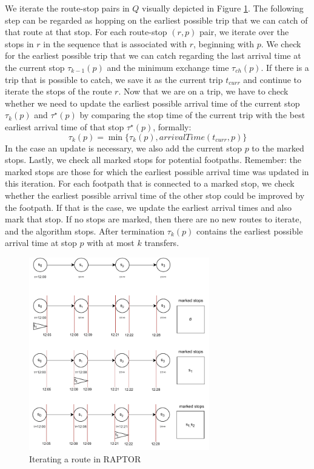 We iterate the route-stop pairs in \(Q\) visually depicted in Figure \ref{fig:raptor}.
The following step can be regarded as hopping on the earliest possible trip that we can catch of that route at that stop.
For each route-stop \((r,p)\) pair, we iterate over the stops in \(r\) in the sequence that is associated with \(r\), beginning with \(p\).
We check for the earliest possible trip that we can catch regarding the last arrival time at the current stop \(\tau_{k-1}(p)\) and the minimum exchange time \(\tau_{ch}(p)\).
If there is a trip that is possible to catch, we save it as the current trip \(t_{curr}\) and continue to iterate the stops of the route \(r\).
Now that we are on a trip, we have to check whether we need to update the earliest possible arrival time of the current stop \(\tau_k(p)\) and \(\tau^\star(p)\) by comparing the stop time of the current trip with the best earliest arrival time of that stop \(\tau^\star(p)\), formally:
\[\tau_k(p) = \min\{\tau_k(p), arrivalTime(t_{curr}, p)\}\]
In the case an update is necessary, we also add the current stop \(p\) to the marked stops.
Lastly, we check all marked stops for potential footpaths.
Remember: the marked stops are those for which the earliest possible arrival time was updated in this iteration.
For each footpath that is connected to a marked stop, we check whether the earliest possible arrival time of the other stop could be improved by the footpath.
If that is the case, we update the earliest arrival times and also mark that stop.
If no stops are marked, then there are no new routes to iterate, and the algorithm stops.
After termination \(\tau_k(p)\) contains the earliest possible arrival time at stop \(p\) with at most \(k\) transfers.
\begin{figure}
    \centering
    \includegraphics[width=0.70\textwidth]{Figures/related_work/raptor.pdf}
    \caption{Iterating a route in RAPTOR}
    \label{fig:raptor}
\end{figure}

